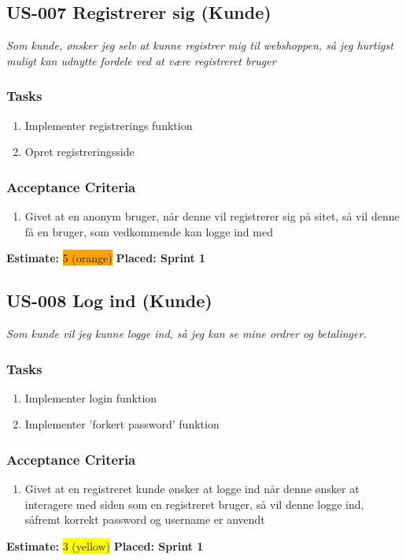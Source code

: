 \subsection{US-007 Registrerer sig (Kunde)}
\label{sec:US-007}
\textit{Som kunde, ønsker jeg selv at kunne registrer mig til webshoppen, så jeg hurtigst muligt kan udnytte fordele ved at være registreret bruger}
\subsubsection*{\textbf{Tasks}}
\begin{enumerate}
  \item Implementer registrerings funktion
  \item Opret registreringsside
\end{enumerate}
\subsubsection*{\textbf{Acceptance Criteria}}
\begin{enumerate}
  \item Givet at en anonym bruger, når denne vil registrerer sig på sitet, så vil denne få en bruger, som vedkommende kan logge ind med
\end{enumerate}
\textbf{Estimate:} \colorbox{orange}{5 (orange)}
\textbf{Placed: Sprint 1}
\par\noindent\dotfill

\subsection{US-008 Log ind (Kunde)}
\label{sec:US-008}
\textit{Som kunde vil jeg kunne logge ind, så jeg kan se mine ordrer og betalinger.}
\subsubsection*{\textbf{Tasks}}
\begin{enumerate}
  \item Implementer login funktion
  \item Implementer 'forkert password' funktion
\end{enumerate}
\subsubsection*{\textbf{Acceptance Criteria}}
\begin{enumerate}
  \item Givet at en registreret kunde ønsker at logge ind når denne ønsker at interagere med siden som en registreret bruger, så vil denne logge ind, såfremt korrekt password og username er anvendt
\end{enumerate}
\textbf{Estimate:} \colorbox{yellow}{3 (yellow)}
\textbf{Placed: Sprint 1}
\par\noindent\dotfill

